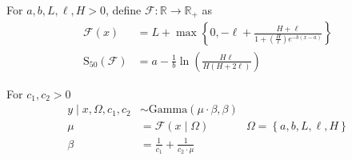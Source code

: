\documentclass[a4paper,12pt]{article}
\begin{document}
    For $a, b, L, \ell, H > 0$, define $\mathcal{F}: \mathbb{R} \to \mathbb{R}_{+}$ as
    \begin{align*}
        \mathcal{F}\left(x\right) &= L + \max\left\{0, -\ell + \frac{H + \ell}{1 + \left(\frac{H}{\ell}\right)e^{-b\left(x-a\right)}} \right\} \tag{4.1.4}\\
        {\text{S}_{50}}\left(\mathcal{F}\right)&= a - \frac1b\ln\left(\frac{H\ell}{H\left(H + 2\ell\right)}\right) \tag{4.1.5}
    \end{align*}


For $c_1, c_2 > 0$
    \begin{align*}
        y \mid x, \Omega, c_1, c_2 &\sim \text{Gamma}\left(\mu\cdot\beta, \beta\right) \tag{4.1.6}\\
        \mu & = \mathcal{F}\left(x \mid \Omega\right)  \tag{4.1.7} \hspace{40pt}{\Omega} = \left\{a, b, L, \ell, H\right\}\\
        \beta &= \frac{1}{c_1} + \frac{1}{c_2\cdot\mu} \tag{4.1.8}\\
    \end{align*}
\end{document}
